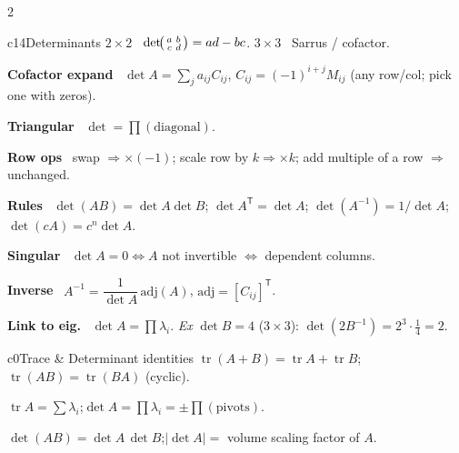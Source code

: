 \documentclass[10pt]{extarticle}
\newcommand{\h}[1]{{\bfseries #1}\ }
\newcommand{\key}[1]{\colorbox{hl}{$#1$}}
\newcommand{\T}{^{\mathsf T}}
\newcommand{\tr}{\operatorname{tr}}
\begin{document}
\begin{multicols}{2}
\begin{tbox}{c14}{Determinants}
\h{$2{\times}2$} $\det\!\begin{psmallmatrix}a&b\\c&d\end{psmallmatrix}=ad-bc$. \h{$3{\times}3$} Sarrus / cofactor.\par
\h{Cofactor expand} $\det A=\sum_j a_{ij}C_{ij}$, $C_{ij}=(-1)^{i+j}M_{ij}$ (any row/col; pick one with zeros).\par
\h{Triangular} $\det=\prod(\text{diagonal})$.\par
\h{Row ops} swap $\Rightarrow\times(-1)$; scale row by $k\Rightarrow\times k$; add multiple of a row $\Rightarrow$ unchanged.\par
\h{Rules} $\det(AB){=}\det A\det B$; $\det A\T{=}\det A$; $\det(A^{-1}){=}1/\det A$; \key{\det(cA)=c^{n}\det A}.\par
\h{Singular} $\det A=0\iff A$ not invertible $\iff$ dependent columns.\par
\h{Inverse} $A^{-1}=\dfrac1{\det A}\,\mathrm{adj}(A)$, $\mathrm{adj}=[C_{ij}]\T$.\par
\h{Link to eig.} $\det A=\prod\lambda_i$. \emph{Ex} $\det B{=}4$ ($3{\times}3$): $\det(2B^{-1}){=}2^3{\cdot}\tfrac14{=}2$.
\end{tbox}

\begin{tbox}{c0}{Trace \& Determinant identities}
$\tr(A+B)=\tr A+\tr B$;\quad \key{\tr(AB)=\tr(BA)} (cyclic).\par
$\tr A=\sum\lambda_i$;\quad $\det A=\prod\lambda_i=\pm\prod(\text{pivots})$.\par
$\det(AB)=\det A\,\det B$;\quad $|\det A|=$ volume scaling factor of $A$.
\end{tbox}


\end{multicols}
\end{document}
